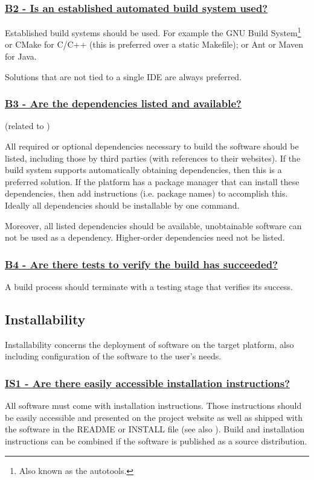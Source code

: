 \documentclass[a4paper,11pt]{article}
\newcommand{\criterion}[2]{\subsubsection*{\underline{#1 - #2}}\label{id:#1}}
\newcommand\CheckTable{%
  \begin{tabular}{ccccc}
    No & Minimal & Adequate & Good & Perfect \\
    0 & 1 & 2 & 3 & 4 \\
    \hline
    $\square$ & $\square$ & $\square$ & $\square$ & $\square$ \\
  \end{tabular}%
}
\newcommand{\refcrit}[1]{%
 \framebox[1.1\width]{\hyperref[id:#1]{#1}}
}
\begin{document}

\newcommand{\bTwoID}{B2}
\newcommand{\bTwoText}{Is an established automated build system used?}
\criterion{\bTwoID}{\bTwoText}

Established build systems should be used. For example the GNU Build
System\footnote{Also known as the autotools.} or CMake for C/C++ (this is
preferred over a static Makefile); or Ant or Maven for Java. 

Solutions that are not tied to a single IDE are always preferred.


\newcommand{\bThreeID}{B3}
\newcommand{\bThreeText}{Are the dependencies listed and available?}
\criterion{\bThreeID}{\bThreeText}
(related to \refcrit{IS2})

All required or optional dependencies necessary to build the software should be
listed, including those by third parties (with references to their websites).
If the build system supports automatically obtaining dependencies, then this is
a preferred solution. If the platform has a package manager that can install
these dependencies, then add instructions (i.e. package names) to accomplish
this. Ideally all dependencies should be installable by one command.

Moreover, all listed dependencies should be available, unobtainable software
can not be used as a dependency. Higher-order dependencies need not be listed.


\newcommand{\bFourID}{B4}
\newcommand{\bFourText}{Are there tests to verify the build has succeeded?}
\criterion{\bFourID}{\bFourText}

A build process should terminate with a testing stage that verifies its success.


\subsection{Installability}\label{sec:ins}

Installability concerns the deployment of software on the target platform, also
including configuration of the software to the user's needs.

\newcommand{\isOneID}{IS1}
\newcommand{\isOneText}{Are there easily accessible installation instructions?}
\criterion{\isOneID}{\isOneText}

All software must come with installation instructions. Those instructions should
be easily accessible and presented on the project website as well as shipped
with the software in the README or INSTALL file (see also \refcrit{IS7}). Build and installation
instructions can be combined if the software is published as a source
distribution.
\end{document}
